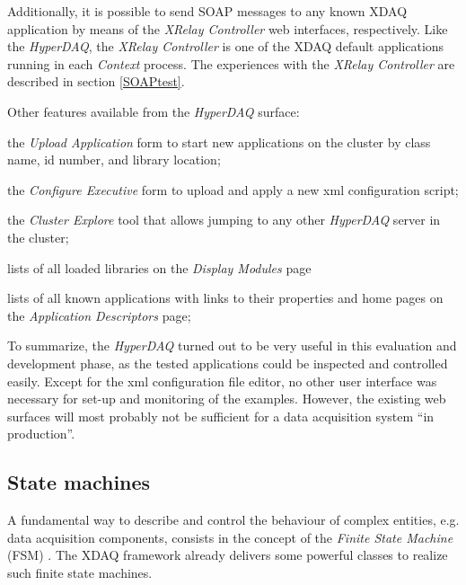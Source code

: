 Additionally, it is possible to send SOAP messages \cite{SOAP} to any
known XDAQ application by means of the {\em XRelay Controller} web interfaces, respectively. Like the {\em HyperDAQ}, the {\em XRelay Controller} is one of the XDAQ default applications running in each 
{\em Context} process.
The experiences with the {\em XRelay Controller} are described in section \ref{SOAPtest}.

Other features available from the {\em HyperDAQ} surface: 
\begin{compactitem}[$\bullet$]

\item the {\em Upload Application} form to start new applications on the
cluster by class name, id number, and library location;

\item the {\em Configure Executive} form to upload and apply a new xml configuration script;

\item the {\em Cluster Explore} tool that allows jumping to any other 
{\em HyperDAQ} server in the cluster;

\item lists of all loaded libraries on the {\em Display Modules} page

\item lists of all known applications with links to their properties and 
home pages on the  {\em Application Descriptors} page; 

\end{compactitem} 

To summarize, the {\em HyperDAQ} turned out to be very useful in this evaluation and development phase, as the tested applications could be inspected and
controlled easily. Except for the xml configuration file editor, no other
user interface was necessary for set-up and monitoring of the examples.
However, the existing web surfaces will most probably not be sufficient for
a data acquisition system ``in production''.


\subsection{State machines}
\label{StateMachineTest}

A fundamental way to describe and control the behaviour of 
complex entities, e.g. data acquisition components, 
consists in the concept of the {\em Finite State Machine} (FSM) \cite{Wikipedia-Statemachine}.
The XDAQ framework already delivers some powerful classes
to realize such finite state machines.

